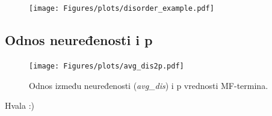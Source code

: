 \documentclass{beamer}
\begin{document}
\begin{frame}
  \begin{figure}
    \vspace{-0.7cm}
    \texttt{[image: Figures/plots/disorder\_example.pdf]}
  \end{figure}
\end{frame}


%


\subsection{Odnos neuređenosti i p}
\begin{frame}
  \begin{figure}
    \centering
    \vspace{-0.5cm}
    \texttt{[image: Figures/plots/avg\_dis2p.pdf]}
    \caption {
      Odnos između neuređenosti (\textit{avg\_dis}) i p vrednosti MF-termina.
    }
  \end{figure}
\end{frame}


\begin{frame}
  \begin{center}
    \Huge Hvala :)
  \end{center}
\end{frame}
\end{document}
